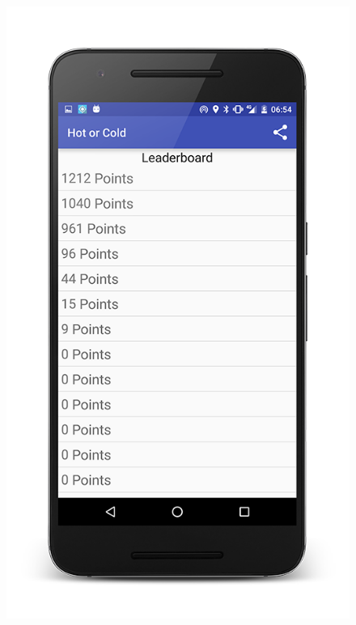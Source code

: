 \documentclass[10pt, a4paper]{article}
\begin{document}
\begin{figure}[!htb]
  \includegraphics[width=1.0\textwidth]{phone_leaderboard_1}
  \caption{}
\endminipage\hfill
{}

\end{figure}
\end{document}
